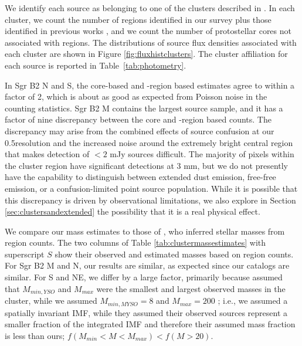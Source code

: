 \documentclass[twocolumn]{aastex61}
\begin{document}

We identify each source as belonging to one of the clusters described in
\citet[][see Figure \ref{fig:overview}]{Schmiedeke2016a}. In each cluster, we
count the number of \hii regions identified in our survey plus those identified
in previous works \citep{Gaume1995a,De-Pree1996a}, and we count the number of
protostellar cores not associated with \hii regions.  The distributions of
source flux densities associated with each cluster are shown in Figure
\ref{fig:fluxhistclusters}.  The cluster affiliation for each source is
reported in Table~\ref{tab:photometry}.

In Sgr B2 N and S, the core-based
and \hii-region based estimates agree to within a factor of 2, which is about
as good as expected from Poisson noise in the counting statistics.  
Sgr B2 M contains the largest source sample, and it has a factor of nine
discrepancy between the core and \hii-region based counts. The discrepancy
may arise from the combined effects of source
confusion at our 0.5\arcsec resolution and the increased noise around the
extremely bright central region that makes detection of $<2$ mJy sources
difficult.  The majority of pixels within the cluster region have significant
detections at 3 mm, but we do not presently have the capability to distinguish
between extended dust emission, free-free emission, or a confusion-limited
point source population.  While it is possible that this discrepancy
is driven by observational limitations, we also explore in Section
\ref{sec:clustersandextended} the possibility that it is a real physical
effect.

We compare our mass estimates to those of \citet{Schmiedeke2016a}, who inferred
stellar masses from \hii region counts.  The  two columns of Table
\ref{tab:clustermassestimates} with superscript $S$ show their observed and
estimated masses based on
\hii region counts.  For Sgr B2 M and N, our results are similar, as expected
since our catalogs are similar.  For S and NE, we differ by a large factor,
primarily because \citet{Schmiedeke2016a} assumed that $M_{min,YSO}$ and $M_{max}$
were the smallest and largest observed masses in the cluster, while we assumed
$M_{min,MYSO}=8$ \msun and $M_{max}=200$ \msun; i.e., we assumed a spatially
invariant IMF, while they assumed their observed sources represent a smaller
fraction of the integrated IMF and therefore their assumed mass fraction is
less than ours; $f(M_{min}< M < M_{max}) < f(M>20)$.


\end{document}

